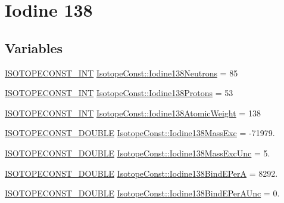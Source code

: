 \hypertarget{group___isotope_const-_iodine-_i138}{}\section{Iodine 138}
\label{group___isotope_const-_iodine-_i138}
\subsection*{Variables}
\begin{DoxyCompactItemize}
\item 
\mbox{\hyperlink{group___isotope_const-_macros_ga5f18360b3e99483a35c32d789e62621c}{I\+S\+O\+T\+O\+P\+E\+C\+O\+N\+S\+T\+\_\+\+I\+NT}} \mbox{\hyperlink{group___isotope_const-_iodine-_i138_gac5eba75cd54e804d6e2d204d09e30cc7}{Isotope\+Const\+::\+Iodine138\+Neutrons}} = 85
\item 
\mbox{\hyperlink{group___isotope_const-_macros_ga5f18360b3e99483a35c32d789e62621c}{I\+S\+O\+T\+O\+P\+E\+C\+O\+N\+S\+T\+\_\+\+I\+NT}} \mbox{\hyperlink{group___isotope_const-_iodine-_i138_ga1dbc44747f5ece6f8a592dbb4a6b8070}{Isotope\+Const\+::\+Iodine138\+Protons}} = 53
\item 
\mbox{\hyperlink{group___isotope_const-_macros_ga5f18360b3e99483a35c32d789e62621c}{I\+S\+O\+T\+O\+P\+E\+C\+O\+N\+S\+T\+\_\+\+I\+NT}} \mbox{\hyperlink{group___isotope_const-_iodine-_i138_gada3517ba250e050de1cb9f0536605424}{Isotope\+Const\+::\+Iodine138\+Atomic\+Weight}} = 138
\item 
\mbox{\hyperlink{group___isotope_const-_macros_ga8f45a7272ce02c0b4c65c44636ed719a}{I\+S\+O\+T\+O\+P\+E\+C\+O\+N\+S\+T\+\_\+\+D\+O\+U\+B\+LE}} \mbox{\hyperlink{group___isotope_const-_iodine-_i138_ga56eb269495844d7b076bd7c8d8cefca3}{Isotope\+Const\+::\+Iodine138\+Mass\+Exc}} = -\/71979.
\item 
\mbox{\hyperlink{group___isotope_const-_macros_ga8f45a7272ce02c0b4c65c44636ed719a}{I\+S\+O\+T\+O\+P\+E\+C\+O\+N\+S\+T\+\_\+\+D\+O\+U\+B\+LE}} \mbox{\hyperlink{group___isotope_const-_iodine-_i138_ga412675a2a9a8f48e6fe83cf7d10f5f7f}{Isotope\+Const\+::\+Iodine138\+Mass\+Exc\+Unc}} = 5.
\item 
\mbox{\hyperlink{group___isotope_const-_macros_ga8f45a7272ce02c0b4c65c44636ed719a}{I\+S\+O\+T\+O\+P\+E\+C\+O\+N\+S\+T\+\_\+\+D\+O\+U\+B\+LE}} \mbox{\hyperlink{group___isotope_const-_iodine-_i138_ga1bc497905b778b8abbf214b70837a592}{Isotope\+Const\+::\+Iodine138\+Bind\+E\+PerA}} = 8292.
\item 
\mbox{\hyperlink{group___isotope_const-_macros_ga8f45a7272ce02c0b4c65c44636ed719a}{I\+S\+O\+T\+O\+P\+E\+C\+O\+N\+S\+T\+\_\+\+D\+O\+U\+B\+LE}} \mbox{\hyperlink{group___isotope_const-_iodine-_i138_gaa8a0286e7ac0e45f3e6ff5948638eb86}{Isotope\+Const\+::\+Iodine138\+Bind\+E\+Per\+A\+Unc}} = 0.

\end{DoxyCompactItemize}
